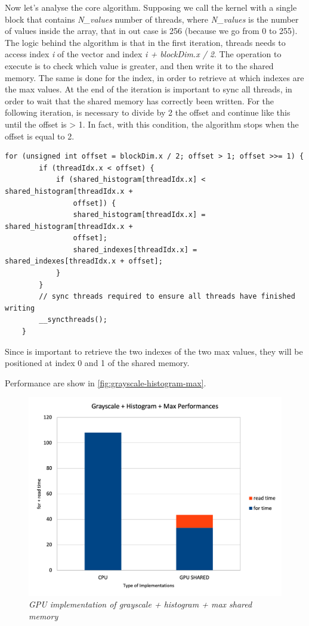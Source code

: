 \documentclass[paper=a4, fontsize=10pt]{scrartcl}	%
\begin{document}
	Now let's analyse the core algorithm. Supposing we call the kernel with a single block that contains \textit{N\_values} number of threads, where \textit{N\_values} is the number of values inside the array, that in out case is 256 (because we go from 0 to 255). The logic behind the algorithm is that in the first iteration, threads needs to access index \textit{i} of the vector and index \textit{i + blockDim.x / 2}. The operation to execute is to check which value is greater, and then write it to the shared memory. The same is done for the index, in order to retrieve at which indexes are the max values. 
	At the end of the iteration is important to sync all threads, in order to wait that the shared memory has correctly been written. For the following iteration, is necessary to divide by 2 the offset and continue like this until the offset is > 1. In fact, with this condition, the algorithm stops when the offset is equal to 2.

	\begin{lstlisting}[style=CStyle]
	for (unsigned int offset = blockDim.x / 2; offset > 1; offset >>= 1) {
		if (threadIdx.x < offset) {
			if (shared_histogram[threadIdx.x] < shared_histogram[threadIdx.x + 
				offset]) {
				shared_histogram[threadIdx.x] = shared_histogram[threadIdx.x + 
				offset];
				shared_indexes[threadIdx.x] = shared_indexes[threadIdx.x + offset];
			}
		}
		// sync threads required to ensure all threads have finished writing
		__syncthreads();
	}
	\end{lstlisting}

	Since is important to retrieve the two indexes of the two max values, they will be positioned at index 0 and 1 of the shared memory.

	Performance are show in \autoref{fig:grayscale-histogram-max}.

	\begin{figure}[H]
		\centering
		\includegraphics[width=0.75\linewidth]{images/binarization/max2.png}
		\caption{\textit{GPU implementation of grayscale + histogram + max shared memory}}
		\label{fig:grayscale-histogram-max}
	\end{figure}
\end{document}
